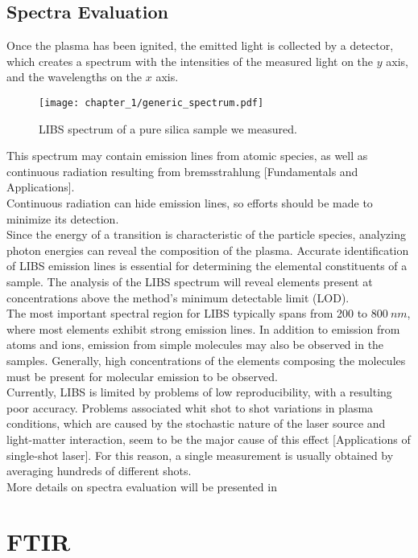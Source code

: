 \subsection{Spectra Evaluation}
\label{subsec:spectra_evaluation}
Once the plasma has been ignited, the emitted light is collected by a detector, which creates a spectrum with the intensities of the measured light on the $y$ axis, and the wavelengths on the $x$ axis. 
\begin{figure}[H]
    \centering
    \texttt{[image: chapter\_1/generic\_spectrum.pdf]}
    \vspace*{-30pt}
    \caption{LIBS spectrum of a pure silica sample we measured.}
    \label{fig:generic_spectrum}
\end{figure}
This spectrum may contain emission lines from atomic species, as well as continuous radiation resulting from bremsstrahlung [Fundamentals and Applications].
\\
Continuous radiation can hide emission lines, so efforts should be made to minimize its detection. 
\\
Since the energy of a transition is characteristic of the particle species, analyzing photon energies can reveal the composition of the plasma.
Accurate identification of LIBS emission lines is essential for determining the elemental constituents of a sample. The analysis of the LIBS spectrum will reveal elements present at concentrations above the method's minimum detectable limit (LOD).
\\
The most important spectral region for LIBS typically spans from 200 to $800\: nm$, where most elements exhibit strong emission lines. In addition to emission from atoms and ions, emission from simple molecules may also be observed in the samples. Generally, high concentrations of the elements composing the molecules must be present for molecular emission to be observed.
\\
Currently, LIBS is limited by problems of low reproducibility, with a resulting poor accuracy. Problems associated whit shot to shot variations in plasma conditions, which are caused by the stochastic nature of the laser source and light-matter interaction, seem to be the major cause of this effect [Applications of single-shot laser]. For this reason, a single measurement is usually obtained by averaging hundreds of different shots.
\\
More details on spectra evaluation will be presented in %

\section{FTIR}
\label{sec:ftir}

